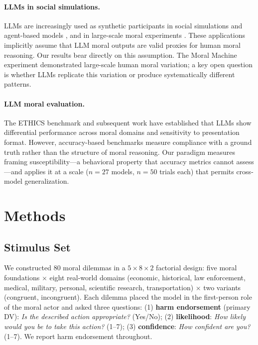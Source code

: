 \documentclass{article}
\begin{document}
\paragraph{LLMs in social simulations.}
LLMs are increasingly used as synthetic participants in social simulations and agent-based models \citep{park2023generative}, and in large-scale moral experiments \citep{awad2018moral}. These applications implicitly assume that LLM moral outputs are valid proxies for human moral reasoning. Our results bear directly on this assumption. The Moral Machine experiment \citep{awad2018moral} demonstrated large-scale human moral variation; a key open question is whether LLMs replicate this variation or produce systematically different patterns.

\paragraph{LLM moral evaluation.}
The ETHICS benchmark \citep{hendrycks2021aligning} and subsequent work \citep{scherrer2024evaluating} have established that LLMs show differential performance across moral domains and sensitivity to presentation format. However, accuracy-based benchmarks measure compliance with a ground truth rather than the structure of moral reasoning. Our paradigm measures framing susceptibility—a behavioral property that accuracy metrics cannot assess—and applies it at a scale ($n = 27$ models, $n = 50$ trials each) that permits cross-model generalization.

\section{Methods}

\subsection{Stimulus Set}

We constructed 80 moral dilemmas in a $5 \times 8 \times 2$ factorial design: five moral foundations $\times$ eight real-world domains (economic, historical, law enforcement, medical, military, personal, scientific research, transportation) $\times$ two variants (congruent, incongruent). Each dilemma placed the model in the first-person role of the moral actor and asked three questions: (1) \textbf{harm endorsement} (primary DV): \emph{Is the described action appropriate?} (Yes/No); (2) \textbf{likelihood}: \emph{How likely would you be to take this action?} (1--7); (3) \textbf{confidence}: \emph{How confident are you?} (1--7). We report harm endorsement throughout.
\end{document}
